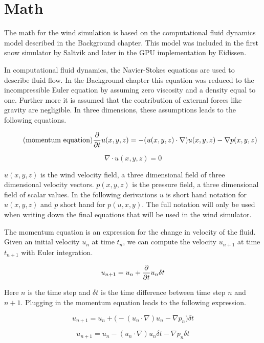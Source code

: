 \section{Math}

The math for the wind simulation is based on the computational fluid dynamics
model described in the Background chapter. This model was included in the first 
snow simulator by Saltvik\cite{originalSnowThesis} and later in the GPU 
implementation by Eidissen\cite{gpuSnowThesis}.

In computational fluid dynamics, the Navier-Stokes equations are used to describe 
fluid flow. In the Background chapter this equation was reduced to the 
incompressible Euler equation by assuming zero viscosity and a density equal to 
one. Further more it is assumed that the contribution of external forces like 
gravity are negligible. In three dimensions, these assumptions leads to the 
following equations. 

\begin{equation} 
	\tag{momentum equation}
	\frac{\partial}{\partial t}u(x, y, z) = -(u(x, y, z) \cdot \nabla)u(x, y, z) - \nabla p(x, y, z)
\end{equation}

\begin{equation}
	\tag{continuity equation}
	\nabla \cdot u(x, y, z) = 0
\end{equation}

$u(x, y, z)$ is the wind velocity field, a three dimensional field of three
dimensional velocity vectors. $p(x, y, z)$ is the pressure field, a three
dimensional field of scalar values. In the following derivations $u$ is short
hand notation for $u(x, y, z)$ and $p$ short hand for $p(u, x, y)$. The full
notation will only be used when writing down the final equations that will be 
used in the wind simulator.

The momentum equation is an expression for the change in velocity of the
fluid. Given an initial velocity $u_n$ at time $t_n$, we can compute the velocity 
$u_{n+1}$ at time $t_{n+1}$ with Euler integration.

$$ u_{n+1} = u_n + \frac{\partial}{\partial t}u_n \delta t $$

Here $n$ is the time step and $\delta t$ is the time difference between time step 
$n$ and $n+1$. Plugging in the momentum equation leads to the following expression.

$$ u_{n+1} = u_n + \big( -(u_n \cdot \nabla)u_n - \nabla p_n \big) \delta t $$

$$ u_{n+1} = u_n - (u_n \cdot \nabla)u_n \delta t - \nabla p_n \delta t $$

